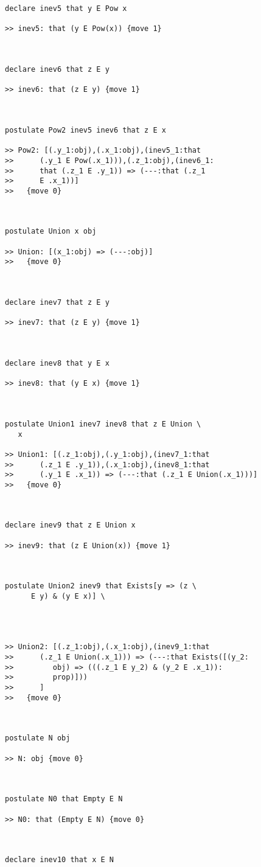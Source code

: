 \documentclass{article}
\begin{document}
\begin{verbatim}
declare inev5 that y E Pow x

>> inev5: that (y E Pow(x)) {move 1}



declare inev6 that z E y

>> inev6: that (z E y) {move 1}



postulate Pow2 inev5 inev6 that z E x

>> Pow2: [(.y_1:obj),(.x_1:obj),(inev5_1:that
>>      (.y_1 E Pow(.x_1))),(.z_1:obj),(inev6_1:
>>      that (.z_1 E .y_1)) => (---:that (.z_1
>>      E .x_1))]
>>   {move 0}



postulate Union x obj

>> Union: [(x_1:obj) => (---:obj)]
>>   {move 0}



declare inev7 that z E y

>> inev7: that (z E y) {move 1}



declare inev8 that y E x

>> inev8: that (y E x) {move 1}



postulate Union1 inev7 inev8 that z E Union \
   x

>> Union1: [(.z_1:obj),(.y_1:obj),(inev7_1:that
>>      (.z_1 E .y_1)),(.x_1:obj),(inev8_1:that
>>      (.y_1 E .x_1)) => (---:that (.z_1 E Union(.x_1)))]
>>   {move 0}



declare inev9 that z E Union x

>> inev9: that (z E Union(x)) {move 1}



postulate Union2 inev9 that Exists[y => (z \
      E y) & (y E x)] \
   



>> Union2: [(.z_1:obj),(.x_1:obj),(inev9_1:that
>>      (.z_1 E Union(.x_1))) => (---:that Exists([(y_2:
>>         obj) => (((.z_1 E y_2) & (y_2 E .x_1)):
>>         prop)]))
>>      ]
>>   {move 0}



postulate N obj

>> N: obj {move 0}



postulate N0 that Empty E N

>> N0: that (Empty E N) {move 0}



declare inev10 that x E N


\end{verbatim}
\end{document}
